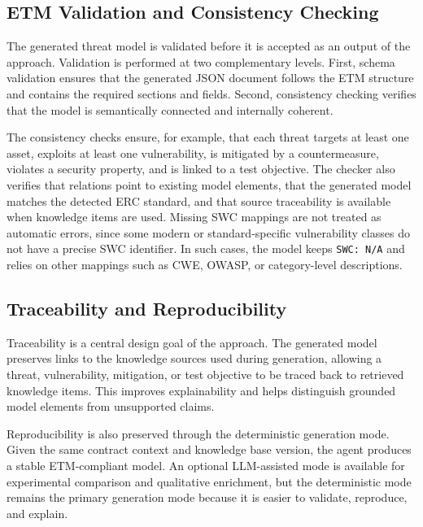 \subsection{ETM Validation and Consistency Checking}
\label{subsec:etm-validation}

The generated threat model is validated before it is accepted as an output of the approach. Validation is performed at two complementary levels. First, schema validation ensures that the generated JSON document follows the ETM structure and contains the required sections and fields. Second, consistency checking verifies that the model is semantically connected and internally coherent.

The consistency checks ensure, for example, that each threat targets at least one asset, exploits at least one vulnerability, is mitigated by a countermeasure, violates a security property, and is linked to a test objective. The checker also verifies that relations point to existing model elements, that the generated model matches the detected ERC standard, and that source traceability is available when knowledge items are used. Missing SWC mappings are not treated as automatic errors, since some modern or standard-specific vulnerability classes do not have a precise SWC identifier. In such cases, the model keeps \texttt{SWC: N/A} and relies on other mappings such as CWE, OWASP, or category-level descriptions.

\subsection{Traceability and Reproducibility}
\label{subsec:traceability-reproducibility}

Traceability is a central design goal of the approach. The generated model preserves links to the knowledge sources used during generation, allowing a threat, vulnerability, mitigation, or test objective to be traced back to retrieved knowledge items. This improves explainability and helps distinguish grounded model elements from unsupported claims.

Reproducibility is also preserved through the deterministic generation mode. Given the same contract context and knowledge base version, the agent produces a stable ETM-compliant model. An optional LLM-assisted mode is available for experimental comparison and qualitative enrichment, but the deterministic mode remains the primary generation mode because it is easier to validate, reproduce, and explain.

